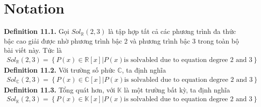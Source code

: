 \documentclass[a4paper,oneside]{book}
\numberwithin{equation}{chapter}
\begin{document}
\section{Notation}
\textbf{Definition 11.1.} Gọi $So{l_\mathbb{R}}\left( {2,3} \right)$ là tập hợp tất cả các phương trình đa thức bậc cao giải được nhờ phương trình bậc 2 và phương trình bậc 3 trong toàn bộ bài viết này. Tức là
\begin{align}
So{l_\mathbb{R}}\left( {2,3} \right) = \left\{ {P\left( x \right) \in \mathbb{R} \left[ x \right]|P\left( x \right) \mbox{is solvabled due to equation degree 2 and 3}} \right\}
\end{align}
\textbf{Definition 11.2.} Với trường số phức $\mathbb{C}$, ta định nghĩa 
\begin{align}
So{l_\mathbb{C}}\left( {2,3} \right) = \left\{ {P\left( x \right) \in \mathbb{C} \left[ x \right]|P\left( x \right) \mbox{is solvabled due to equation degree 2 and 3}} \right\}
\end{align}
\textbf{Definition 11.3.} Tổng quát hơn, với $\mathbb{K}$ là một trường bất kỳ, ta định nghĩa
\begin{align}
So{l_\mathbb{K}}\left( {2,3} \right) = \left\{ {P\left( x \right) \in \mathbb{K} \left[ x \right]|P\left( x \right) \mbox{is solvabled due to equation degree 2 and 3}} \right\}
\end{align}
\end{document}
